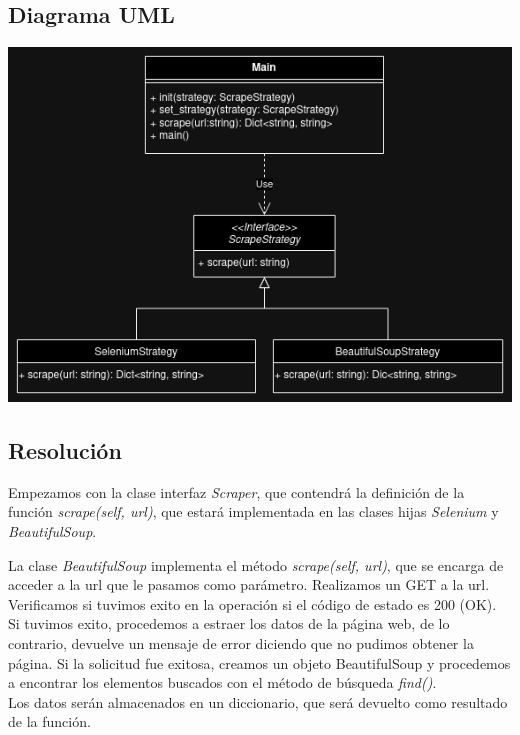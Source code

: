 \documentclass{article} %
\begin{document}
    \subsection{Diagrama UML}
    \includegraphics[width=\textwidth]{imagenes/P1_E5.drawio.png}
    
    \subsection{Resolución}
    \hspace*{1cm}Empezamos con la clase interfaz \textit{Scraper}, que contendrá la definición de la función
    \textit{scrape(self, url)}, que estará implementada en las clases hijas \textit{Selenium} y \textit{BeautifulSoup}.

    \hspace*{1cm}La clase \textit{BeautifulSoup} implementa el método \textit{scrape(self, url)}, que se encarga de acceder 
    a la url que le pasamos como parámetro. Realizamos un GET a la url. Verificamos si tuvimos exito en la operación 
    si el código de estado es 200 (OK). Si tuvimos exito, procedemos a estraer los datos de la página web, de lo contrario,
    devuelve un mensaje de error diciendo que no pudimos obtener la página. Si la solicitud fue exitosa, creamos un objeto 
    BeautifulSoup y procedemos a encontrar los elementos buscados con el método de búsqueda \textit{find()}.\\
    Los datos serán almacenados en un diccionario, que será devuelto como resultado de la función.
\end{document}
